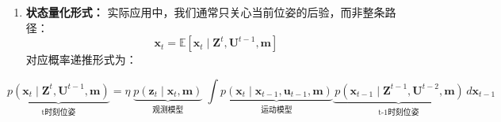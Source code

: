 \documentclass[../main.tex]{subfiles}
\begin{document}
\begin{enumerate}
{\begin{enumerate}
        将上述代入后，得到最终递推形式：
        \[
        \boxed{
        p(\mathbf{X}^{t} \mid \mathbf{Z}^{t}, \mathbf{U}^{t-1}, \mathbf{m})
        = \eta \, p(\mathbf{z}_t \mid \mathbf{x}_t, \mathbf{m})
        \, p(\mathbf{x}_t \mid \mathbf{x}_{t-1}, \mathbf{u}_{t-1}, \mathbf{m})
        \, p(\mathbf{X}^{t-1} \mid \mathbf{Z}^{t-1}, \mathbf{U}^{t-2}, \mathbf{m})
        }
        \]
        分别代表：\\
        - \( p(\mathbf{X}^{t} \mid \mathbf{Z}^{t}, \mathbf{U}^{t-1}, \mathbf{m}) \)：t时刻的后验分布\\
        - \( p(\mathbf{z}_t \mid \mathbf{x}_t, \mathbf{m}) \)：观测模型\\
        - \( p(\mathbf{x}_t \mid \mathbf{x}_{t-1}, \mathbf{u}_{t-1}, \mathbf{m}) \)：运动模型  \\
        - \( p(\mathbf{X}^{t-1} \mid \mathbf{Z}^{t-1}, \mathbf{U}^{t-2}, \mathbf{m}) \)：t-1时刻的后验分布
        
        
        \item \textbf{状态量化形式：}
        实际应用中，我们通常只关心当前位姿的后验，而非整条路径：
        \[
        \mathbf{x}_t = \mathbb{E}\left[\mathbf{x}_t \mid \mathbf{Z}^{t}, \mathbf{U}^{t-1}, \mathbf{m}\right]
        \]
        对应概率递推形式为：
        \end{enumerate}
        \[
        \underbrace{p(\mathbf{x}_t \mid \mathbf{Z}^{t}, \mathbf{U}^{t-1}, \mathbf{m})}_{\text{t时刻位姿}}
        = \eta \;
        \underbrace{p(\mathbf{z}_t \mid \mathbf{x}_t, \mathbf{m})}_{\text{观测模型}} \;
        \int 
        \underbrace {p(\mathbf{x}_t \mid \mathbf{x}_{t-1}, \mathbf{u}_{t-1}, \mathbf{m})
        }_{\text{运动模型}}
        \underbrace{
          \, p(\mathbf{x}_{t-1} \mid \mathbf{Z}^{t-1}, \mathbf{U}^{t-2}, \mathbf{m})
        }_{\text{t-1时刻位姿}}
        \, d\mathbf{x}_{t-1} \]
        }
    \end{enumerate}
\end{document}
